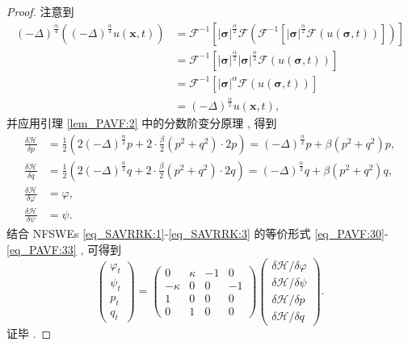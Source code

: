 \begin{proof}
注意到
\begin{align}\label{eq_PAVF:12071}
(-\Delta)^{\frac{\alpha}{4}}((-\Delta)^{\frac{\alpha}{4}}  u(\boldsymbol{x} , t))&=\mathcal{F}^{-1}\left[|\boldsymbol{\sigma}|^{\frac{\alpha}{2}} \mathcal{F}(\mathcal{F}^{-1}\left[|\boldsymbol{\sigma}|^{\frac{\alpha}{2}} \mathcal{F}(u(\boldsymbol{\sigma} , t))\right])\right]\nonumber\\
&=\mathcal{F}^{-1}\left[|\boldsymbol{\sigma}|^{\frac{\alpha}{2}} |\boldsymbol{\sigma}|^{\frac{\alpha}{2}} \mathcal{F}(u(\boldsymbol{\sigma} , t))\right]\nonumber\\
&=\mathcal{F}^{-1}\left[|\boldsymbol{\sigma}|^{\alpha} \mathcal{F}(u(\boldsymbol{\sigma} , t))\right]\nonumber\\
&=(-\Delta)^{\frac{\alpha}{2}} u(\boldsymbol{x} , t) , 
\end{align}
并应用引理 \ref{lem_PAVF:2} 中的分数阶变分原理 , 得到
\begin{align}
\frac{\delta \mathcal{H}}{\delta p} &=\frac{1}{2}\left(2(-\Delta)^{\frac{\alpha}{2}} p+2 \cdot \frac{\beta}{2}\left(p^{2}+q^{2}\right) \cdot 2 p\right)=(-\Delta)^{\frac{\alpha}{2}}p+\beta\left(p^{2}+q^{2}\right) p , \label{eq_PAVF:38a}\\
\frac{\delta \mathcal{H}}{\delta q} &=\frac{1}{2}\left(2(-\Delta)^{\frac{\alpha}{2}} q+2 \cdot \frac{\beta}{2}\left(p^{2}+q^{2}\right) \cdot 2 q\right)=(-\Delta)^{\frac{\alpha}{2}}q+\beta\left(p^{2}+q^{2}\right) q , \label{eq_PAVF:38b}\\
\frac{\delta \mathcal{H}}{\delta \varphi} &=\varphi , \label{eq_PAVF:38c}\\
\frac{\delta \mathcal{H}}{\delta \psi} &=\psi . \label{eq_PAVF:38}
\end{align}
结合 NFSWEs \eqref{eq_SAVRRK:1}-\eqref{eq_SAVRRK:3} 的等价形式 \eqref{eq_PAVF:30}-\eqref{eq_PAVF:33} , 可得到
\begin{equation}\label{eq_PAVF:39}
\left(\begin{array}{l}
		\varphi_{t} \\
		\psi_{t} \\
		p_{t} \\
		q_{t}
\end{array}\right)
=\left(\begin{array}{cccc}
			0 & \kappa & -1 & 0 \\
			-\kappa & 0 & 0 & -1 \\
			1 & 0 & 0 & 0 \\
			0 & 1 & 0 & 0
\end{array}\right)
\left(\begin{array}{l}
		\delta \mathcal{H} / \delta \varphi \\
		\delta \mathcal{H} / \delta \psi \\
		\delta \mathcal{H} / \delta p \\
		\delta \mathcal{H} / \delta q
\end{array}\right) . 
\end{equation}
证毕 . 
\end{proof}


